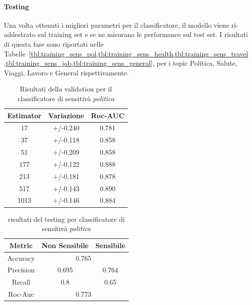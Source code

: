 \paragraph{Testing} Una volta ottenuti i migliori parametri per il classificatore, il modello viene ri-addestrato sul training set e se ne misurano le performance sul test set.  I risultati di questa fase sono riportati nelle Tabelle~\cref{tbl:training_sens_pol,tbl:training_sens_health,tbl:training_sens_travel,tbl:training_sens_job,tbl:training_sens_general}, per i topic Politica, Salute, Viaggi, Lavoro e General rispettivamente.


\begin{table}[h]

\centering
\begin{tabular}{|c|c|c|}
\hline
\textbf{Estimator} & \textbf{Variazione} & \textbf{Roc-AUC} \\ \hline
17 & +/-0.240 & 0.781 \\ \hline
37 & +/-0.118 & 0.858 \\ \hline
51 & +/-0.209 & 0.858 \\ \hline
177 & +/-0.122 & 0.888 \\ \hline
213 & +/-0.181 & 0.878 \\ \hline
517 & +/-0.143 & 0.890 \\ \hline
1013 & +/-0.146 & 0.884 \\ \hline
\end{tabular}
\caption{Risultati della validation per il classificatore di sensitivà \textit{politica}}
\label{tbl:val_sens_pol}
\end{table}
\FloatBarrier

\begin{table}[h]
\centering
\begin{tabular}{|c|c|c|}
\hline
\textbf{Metric} & \textbf{Non Sensibile} & \textbf{Sensibile} \\ \hline
Accuracy & \multicolumn{2}{c|}{0.765} \\ \hline
Precision & 0.695 & 0.764 \\ \hline
Recall & 0.8 & 0.65 \\ \hline
Roc-Auc & \multicolumn{2}{c|}{0.773} \\ \hline
\end{tabular}
\caption{risultati del testing per classificatore di sensitivà \textit{politica}}
\label{tbl:training_sens_pol}
\end{table}
\FloatBarrier


